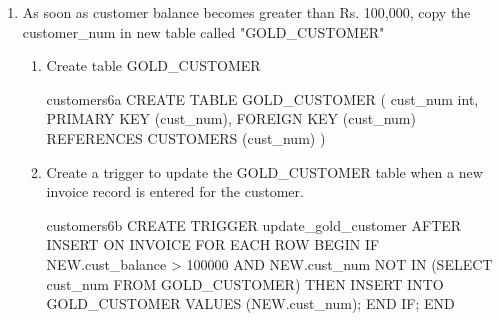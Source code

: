 \begin{enumerate}
\begin{enumerate}
              \item SQL

                    \begin{sqlQuery}{customers5}
                        SELECT inv_date, sum(unit_sold)
                        FROM INVOICE
                        GROUP BY inv_date
                    \end{sqlQuery}

              \item Output

                    \begin{lstlisting}[style=output]
practicals=# SELECT inv_date, sum(unit_sold)
    FROM INVOICE
    GROUP BY inv_date;
  inv_date  | sum 
------------+-----
 2015-10-01 |  10
 2015-07-01 |   7
 2015-03-01 |   3
 2015-02-01 |   2
 2015-01-01 |   8
 2015-06-01 |  14
 2015-05-01 |   5
 2015-11-01 |   1
 2015-04-01 |  13
(9 rows)
                \end{lstlisting}


          \end{enumerate}

    \item As soon as customer balance becomes greater than Rs. 100,000, copy the customer\_num in new table
          called "GOLD\_CUSTOMER"

          \begin{enumerate}
              \item Create table GOLD\_CUSTOMER

                    \begin{sqlQuery}{customers6a}
                        CREATE TABLE GOLD_CUSTOMER
                        (
                            cust_num int,
                            PRIMARY KEY (cust_num),
                            FOREIGN KEY (cust_num) REFERENCES CUSTOMERS (cust_num)
                        )
                    \end{sqlQuery}
                    \pagebreak

              \item Create a trigger to update the GOLD\_CUSTOMER table when a new invoice record is entered for the customer.

                    \begin{sqlQuery}{customers6b}
                        CREATE TRIGGER update_gold_customer
                        AFTER INSERT ON INVOICE
                        FOR EACH ROW
                        BEGIN
                            IF NEW.cust_balance > 100000 
                            AND NEW.cust_num NOT IN (SELECT cust_num FROM GOLD_CUSTOMER) THEN
                                INSERT INTO GOLD_CUSTOMER VALUES (NEW.cust_num);
                            END IF;
                        END                        
                    \end{sqlQuery}


\end{enumerate}
\end{enumerate}
